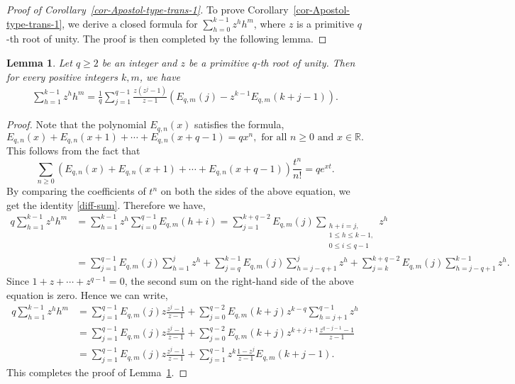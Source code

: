 \documentclass[12pt]{amsart}
\newcommand{\R}{{\mathbb R}}
\newtheorem{lem}{Lemma}
\newcommand{\lemref}[1]{Lemma~\ref{#1}}
\newcommand{\corref}[1]{Corollary~\ref{#1}}
\begin{document}
\begin{proof}[Proof of \corref{cor-Apostol-type-trans-1}]
 To prove \corref{cor-Apostol-type-trans-1}, we derive a closed formula for $\sum_{h=0}^{k-1}z^hh^m$, where $z$ 
 is a primitive $q$-th root of unity. The proof is then completed by the following lemma.
 \end{proof}
 \begin{lem}\label{sum}
Let $q\geq2$ be an integer and $z$ be a primitive $q$-th root of unity. Then for every positive integers $k,m$, we have
\begin{align}\label{m-power-sum-z}
\sum_{h=1}^{k-1}z^{h}h^m =\frac{1}{q}\sum_{j=1}^{q-1} \frac{z(z^{j}-1)}{z-1}\left(E_{q,m}(j)-z^{k-1}E_{q,m}(k+j-1)\right).
\end{align}
\end{lem}
\begin{proof}
 Note that the polynomial $E_{q,n}(x)$ satisfies the formula,
\begin{equation}\label{diff-sum}
E_{q,n}(x)+E_{q,n}(x+1)+\cdots+E_{q,n}(x+q-1)=qx^n, \text{\ \ \ for all $n\geq 0$ and $x\in \R$.}
\end{equation}
This follows from the fact that
$$
\sum_{n\ge 0}\left(E_{q,n}(x)+E_{q,n}(x+1)+\cdots+E_{q,n}(x+q-1)\right)\frac{t^n}{n!}=qe^{xt}.
$$
By comparing the coefficients of $t^n$ on both the sides of the above equation, we get the identity \eqref{diff-sum}. 
Therefore we have,
\begin{align*}
q\sum_{h=1}^{k-1}z^{h}h^m&=\sum_{h=1}^{k-1}z^h\sum_{i=0}^{q-1}E_{q,m}(h+i)=\sum_{j=1}^{k+q-2}E_{q,m}(j)
\sum_{\substack{h+i=j, \\1\leq h\leq k-1,\\ 0\leq i\leq q-1}}z^h\\                                         
&=\sum_{j=1}^{q-1}E_{q,m}(j)\sum_{h=1}^{j}z^h+\sum_{j=q}^{k-1}E_{q,m}(j)\sum_{h=j-q+1}^{j}z^h+ \sum_{j=k}^{k+q-2}E_{q,m}(j)\sum_{h=j-q+1}^{k-1}z^h.
\end{align*}
Since $1+z+\cdots+z^{q-1}=0$, the second sum on the right-hand side of the above equation is zero. Hence we can write,
\begin{align*}                                            
 q\sum_{h=1}^{k-1}z^{h}h^m&=\sum_{j=1}^{q-1}E_{q,m}(j)z\frac{z^{j}-1}{z-1}+\sum_{j=0}^{q-2}E_{q,m}(k+j)z^{k-q}\sum_{h=j+1}^{q-1}z^h\\
 &=\sum_{j=1}^{q-1}E_{q,m}(j)z\frac{z^{j}-1}{z-1}+\sum_{j=0}^{q-2}E_{q,m}(k+j)z^{k+j+1}\frac{z^{q-j-1}-1}{z-1}\\
 &=\sum_{j=1}^{q-1}E_{q,m}(j)z\frac{z^{j}-1}{z-1}+\sum_{j=1}^{q-1}z^k\frac{1-z^{j}}{z-1}E_{q,m}(k+j-1).
\end{align*}
This completes the proof of \lemref{sum}.
\end{proof}
\end{document}

